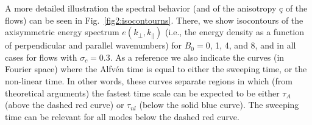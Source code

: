 \documentclass[aip,pop,reprint,amsmath,amssymb,floatfix]{revtex4-1}
\begin{document}
A more detailed illustration the spectral behavior (and of the anisotropy ç
of the flows) can be seen in Fig.~\ref{fig2:isocontourns}. There, we show 
isocontours of the axisymmetric energy spectrum $e(k_\perp, k_\parallel)$ 
(i.e., the energy density as a function of perpendicular and parallel
wavenumbers) for $B_0=0$, 1, 4, and 8, and in all cases for flows with
$\sigma_c = 0.3$. As a reference we also indicate the curves (in Fourier
space) where the Alfv\'en time is equal to either the sweeping time,
or the non-linear time. In other words, these curves separate regions
in which (from theoretical arguments) the fastest time scale can be
expected to be either $\tau_A$ (above the dashed red curve) or
$\tau_{nl}$ (below the solid blue curve). The sweeping time can be
relevant for all modes below the dashed red curve.
\end{document}
